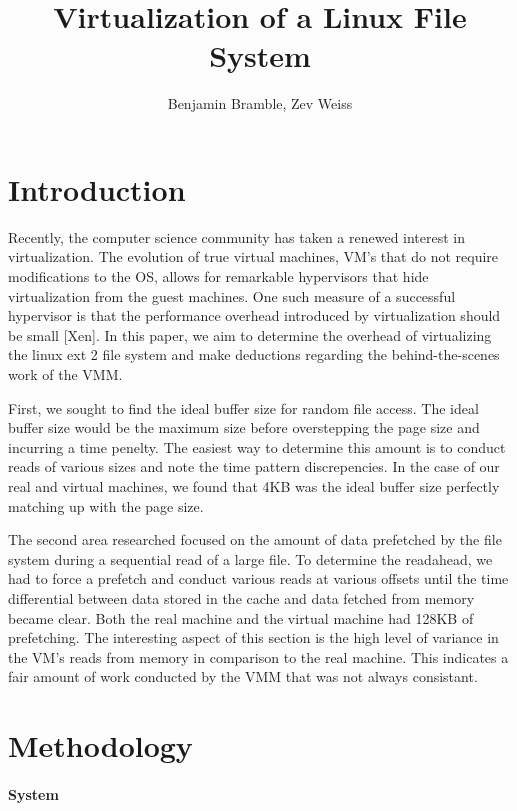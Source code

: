 \documentclass[a4paper,10pt,twocolumn]{article}
\title{Virtualization of a Linux File System}
\author{Benjamin Bramble, Zev Weiss}
\begin{document}
\maketitle

\begin{abstract}

\end{abstract}

\section{Introduction}
Recently, the computer science community has taken a renewed interest in virtualization.  
The evolution of true virtual machines, VM's that do not require modifications to the OS, allows for remarkable hypervisors that hide virtualization from the guest machines.  
One such measure of a successful hypervisor is that the performance overhead introduced by virtualization should be small [Xen]. In this paper, we aim to determine the overhead of virtualizing the linux ext 2 file system and make deductions regarding the behind-the-scenes work of the VMM.

First, we sought to find the ideal buffer size for random file access.  
The ideal buffer size would be the maximum size before overstepping the page size and incurring a time penelty.
The easiest way to determine this amount is to conduct reads of various sizes and note the time pattern discrepencies.
In the case of our real and virtual machines, we found that 4KB was the ideal buffer size perfectly matching up with the page size.

The second area researched focused on the amount of data prefetched by the file system during a sequential read of a large file.
To determine the readahead, we had to force a prefetch and conduct various reads at various offsets until the time differential between data stored in the cache and data fetched from memory became clear.
Both the real machine and the virtual machine had 128KB of prefetching.
The interesting aspect of this section is the high level of variance in the VM's reads from memory in comparison to the real machine.
This indicates a fair amount of work conducted by the VMM that was not always consistant. 


\section{Methodology}
\paragraph{System}
\end{document}
